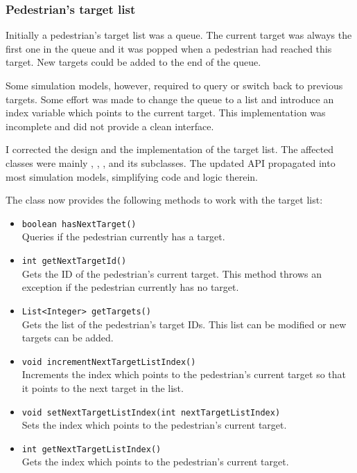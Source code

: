 \subsubsection{Pedestrian's target list}

Initially a pedestrian's target list was a queue.
The current target was always the first one in the queue and it was popped when
a pedestrian had reached this target.
New targets could be added to the end of the queue.

Some simulation models, however, required to query or switch back to previous
targets.
Some effort was made to change the queue to a list and introduce an index
variable which points to the current target.
This implementation was incomplete and did not provide a clean interface.

I corrected the design and the implementation of the target list.
The affected classes were mainly , ,
, and its subclasses.
The updated \acs{API} propagated into most simulation models, simplifying code
and logic therein.

The class  now provides the following methods to work with the
target list:

\begin{itemize}

  \item \verb|boolean hasNextTarget()|
    \\
    Queries if the pedestrian currently has a target.

  \item \verb|int getNextTargetId()|
    \\
    Gets the \acs{ID} of the pedestrian's current target.
    This method throws an exception if the pedestrian currently has no target.

  \item \verb|List<Integer> getTargets()|
    \\
    Gets the list of the pedestrian's target \acsp{ID}.
    This list can be modified or new targets can be added.

  \item \verb|void incrementNextTargetListIndex()|
    \\
    Increments the index which points to the pedestrian's current target so that
    it points to the next target in the list.

  \item \verb|void setNextTargetListIndex(int nextTargetListIndex)|
    \\
    Sets the index which points to the pedestrian's current target.

  \item \verb|int getNextTargetListIndex()|
    \\
    Gets the index which points to the pedestrian's current target.

\end{itemize}

